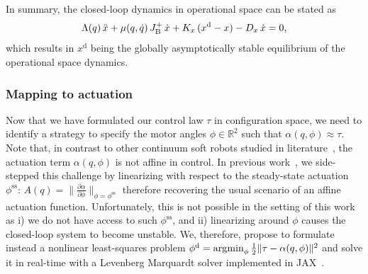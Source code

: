 
In summary, the closed-loop dynamics in operational space can be stated as
\begin{equation}\label{eq:hsacontrol:task_space_impedance_control:closed_loop_dynamics}
    \Lambda(q) \, \Ddot{x} + \mu(q,\dot{q}) \, J_\mathrm{B}^+ \, \dot{x} + K_x \, (x^\mathrm{d} - x) - D_x \, \dot{x} = 0,
\end{equation}
which results in $x^\mathrm{d}$ being the globally asymptotically stable equilibrium of the operational space dynamics.


\subsubsection{Mapping to actuation}
%
Now that we have formulated our control law $\tau$ in configuration space, we need to identify a strategy to specify the motor angles $\phi \in \mathbb{R}^2$ such that $\alpha(q,\phi) \approx \tau$. Note that, in contrast to other continuum soft robots studied in literature~\cite{della2023model}, the actuation term $\alpha(q,\phi)$ is not affine in control. %
In previous work~\cite{stolzle2024experimental}, we side-stepped this challenge by linearizing with respect to the steady-state actuation $\phi^\mathrm{ss}$: $A(q) = \lVert \frac{\partial \alpha}{\partial \phi}\rVert_{\phi=\phi^\mathrm{ss}}$ therefore recovering the usual scenario of an affine actuation function. Unfortunately, this is not possible in the setting of this work as i) we do not have access to such $\phi^\mathrm{ss}$, and ii) linearizing around $\phi$ causes the closed-loop system to become unstable. We, therefore, propose to formulate instead a nonlinear least-squares problem $\phi^\mathrm{d} = \operatorname*{\arg\!\min}_\phi \frac{1}{2} \lVert \tau - \alpha(q,\phi) \rVert^2$ and solve it in real-time with a Levenberg Marquardt solver implemented in JAX~\cite{jaxopt_implicit_diff}.

